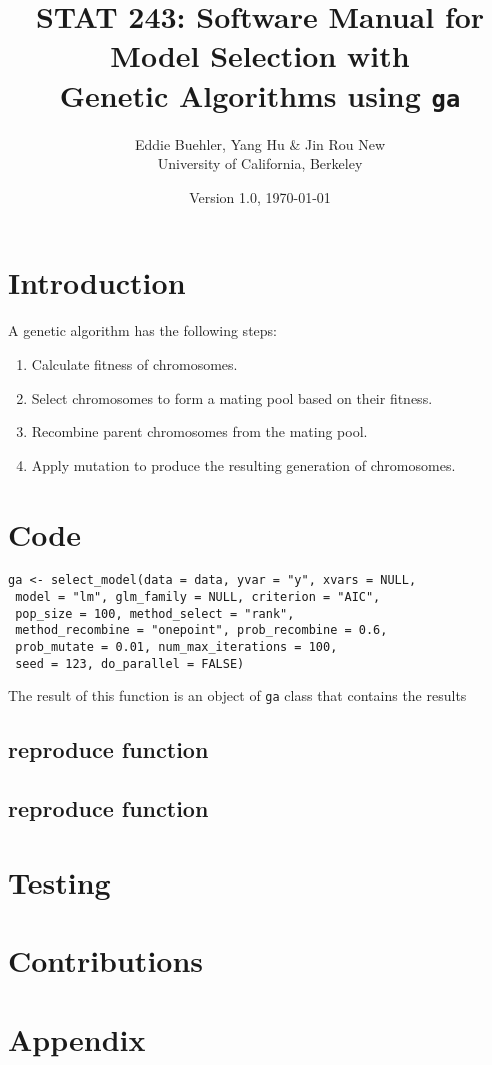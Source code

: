 \documentclass[11pt]{article}
\title{STAT 243: Software Manual for Model Selection with\\ 
	Genetic Algorithms using \texttt{ga}}
\author{Eddie Buehler, Yang Hu \& Jin Rou New\\
	University of California, Berkeley}
\date{Version 1.0, \today}
\begin{document}
\maketitle

\section{Introduction}
A genetic algorithm has the following steps: 
\begin{enumerate}
	\item Calculate fitness of chromosomes.
	\item Select chromosomes to form a mating pool based on their fitness.
	\item Recombine parent chromosomes from the mating pool.
	\item Apply mutation to produce the resulting generation of chromosomes.
\end{enumerate}

\section{Code}

\begin{verbatim}
ga <- select_model(data = data, yvar = "y", xvars = NULL,
 model = "lm", glm_family = NULL, criterion = "AIC",
 pop_size = 100, method_select = "rank",
 method_recombine = "onepoint", prob_recombine = 0.6,
 prob_mutate = 0.01, num_max_iterations = 100,
 seed = 123, do_parallel = FALSE)
\end{verbatim}



The result of this function is an object of \texttt{ga} class that contains the results
\subsection{reproduce function}

\subsection{reproduce function}

\section{Testing} 

\section{Contributions} 

\section{Appendix}

\end{document}
